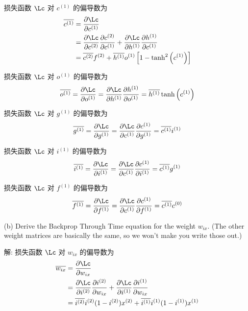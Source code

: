 \documentclass[openany]{ctexbook}
\theoremstyle{kaiti}
\theoremstyle{normal}
\begin{document}
损失函数 $\Lc$ 对 $c^{(1)}$ 的偏导数为
\begin{equation}
  \begin{aligned}
    \overline{c^{(1)}}
    &=\frac{\partial\Lc}{\partial c^{(1)}}\\
    &=\frac{\partial\Lc}{\partial c^{(2)}}\frac{\partial c^{(2)}}{\partial c^{(1)}}
      +\frac{\partial\Lc}{\partial h^{(1)}}\frac{\partial h^{(1)}}{\partial c^{(1)}}\\
    &=\overline{c^{(2)}}f^{(2)}
      +\overline{h^{(1)}}o^{(1)}\left[1-\tanh^2\left(c^{(1)}\right)\right]\\
  \end{aligned}
\end{equation}

损失函数 $\Lc$ 对 $o^{(1)}$ 的偏导数为
\begin{equation}
    \overline{o^{(1)}}
    =\frac{\partial\Lc}{\partial o^{(1)}}
    =\frac{\partial\Lc}{\partial h^{(1)}}\frac{\partial h^{(1)}}{\partial o^{(1)}}
    =\overline{h^{(1)}}\tanh\left(c^{(1)}\right)
\end{equation}

损失函数 $\Lc$ 对 $g^{(1)}$ 的偏导数为
\begin{equation}
    \overline{g^{(1)}}
    =\frac{\partial\Lc}{\partial g^{(1)}}
    =\frac{\partial\Lc}{\partial c^{(1)}}\frac{\partial c^{(1)}}{\partial g^{(1)}}
    =\overline{c^{(1)}}i^{(1)}
\end{equation}

损失函数 $\Lc$ 对 $i^{(1)}$ 的偏导数为
\begin{equation}
    \overline{i^{(1)}}
    =\frac{\partial\Lc}{\partial i^{(1)}}
    =\frac{\partial\Lc}{\partial c^{(1)}}\frac{\partial c^{(1)}}{\partial i^{(1)}}
    =\overline{c^{(1)}}g^{(1)}
\end{equation}

损失函数 $\Lc$ 对 $f^{(1)}$ 的偏导数为
\begin{equation}
    \overline{f^{(1)}}
    =\frac{\partial\Lc}{\partial f^{(1)}}
    =\frac{\partial\Lc}{\partial c^{(1)}}\frac{\partial c^{(1)}}{\partial f^{(1)}}
    =\overline{c^{(1)}}c^{(0)}
\end{equation}

(b) Derive the Backprop Through Time equation for the weight $w_{ix}$. (The other weight matrices are basically the same, so we won't make you write those out.)

解: 损失函数 $\Lc$ 对 $w_{ix}$ 的偏导数为
\begin{equation}
  \begin{aligned}
    \overline{w_{ix}}
    &=\frac{\partial\Lc}{\partial w_{ix}}\\
    &=\frac{\partial\Lc}{\partial i^{(2)}}\frac{\partial i^{(2)}}{\partial w_{ix}}
      +\frac{\partial\Lc}{\partial i^{(1)}}\frac{\partial i^{(1)}}{\partial w_{ix}}\\
    &=\overline{i^{(2)}}i^{(2)}(1-i^{(2)})x^{(2)}+\overline{i^{(1)}}i^{(1)}(1-i^{(1)})x^{(1)}\\
  \end{aligned}
\end{equation}
\end{document}
